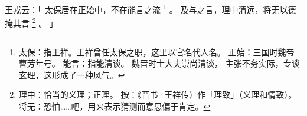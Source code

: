 
\switchcolumn*[\section{}]

王戎云：「
    太保居在正始中，不在能言之流%
    \footnote{%
        太保：指王祥。王祥曾任太保之职，这里以官名代人名。
        正始：三国时魏帝曹芳年号。
        能言：指能清谈。
              魏晋时士大夫崇尚清谈，
              主张不务实际，专谈玄理，这形成了一种风气。
    }%
    。
    及与之言，理中清远，将无以德掩其言%
    \footnote{%
        理中：恰当的义理；正理。
        按：《晋书·王祥传）作「理致」（义理和情致）。
        将无：恐怕……吧，用来表示猜测而意思偏于肯定。
    }%
    。
」

\switchcolumn



